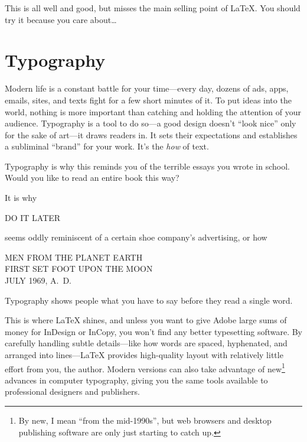 This is all well and good,
but misses the main selling point of \LaTeX.
You should try it because you care about\ldots

\chapter{Typography}
\label{typography}

Modern life is a constant battle for your time---every day,
dozens of ads, apps, emails, sites, and texts fight
for a few short minutes of it.
To put ideas into the world,
nothing is more important than catching and holding
the attention of your audience.
Typography is a tool to do so---a good design doesn't ``look nice''
only for the sake of art---it draws readers in.\punckern{}
It sets their expectations and establishes a subliminal ``brand'' for your
work.\punckern{}
It's the \emph{how} of text.
\begin{leftfigure}
\fontsize{12pt}{24pt}\selectfont\raggedright
Typography is why this reminds you of the terrible essays
you wrote in school.
Would you like to read an entire book this way?
\end{leftfigure}
It is why
\begin{leftfigure}
\noindent{}\Large DO IT LATER
\end{leftfigure}
seems oddly reminiscent of a certain shoe company's advertising,
or how
\begin{center}
\noindent MEN FROM THE PLANET EARTH \\
FIRST SET FOOT UPON THE MOON \\
JULY 1969, A.~D.
\end{center}
Typography shows people
what you have to say before they read a single word.

This is where \LaTeX{} shines, and
unless you want to give Adobe large sums
of money for InDesign or InCopy,
you won't find any better typesetting software.
By carefully handling subtle details---like how words are spaced,
hyphenated, and arranged into lines---\LaTeX{} provides high-quality layout
with relatively little effort from you, the author.
Modern versions can also take advantage of new\footnote{By new,
I mean ``from the mid-1990s''\quotekern, but web browsers and desktop publishing
software are only just starting to catch up.} advances in computer typography,
giving you the same tools available to professional designers and publishers.

